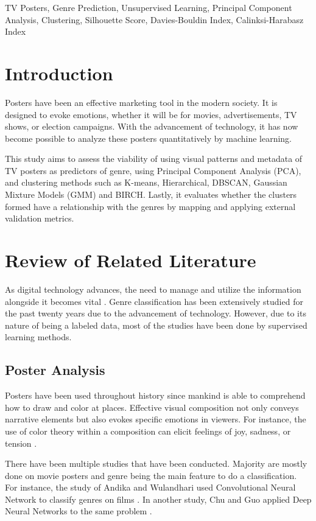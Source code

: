 \documentclass[conference]{IEEEtran}
\begin{document}
\begin{IEEEkeywords}
TV Posters, Genre Prediction, Unsupervised Learning, Principal Component Analysis, Clustering, Silhouette Score, Davies-Bouldin Index, Calinksi-Harabasz Index 
\end{IEEEkeywords}

\section{Introduction}
Posters have been an effective marketing tool in the modern society. It is designed to evoke emotions, whether it will be for movies, advertisements, TV shows, or election campaigns. With the advancement of technology, it has now become possible to analyze these posters quantitatively by machine learning. 

This study aims to assess the viability of using visual patterns and metadata of TV posters as predictors of genre, using Principal Component Analysis (PCA), and clustering methods such as K-means, Hierarchical, DBSCAN, Gaussian Mixture Models (GMM) and BIRCH. Lastly, it evaluates whether the clusters formed have a relationship with the genres by mapping and applying external validation metrics.

\section{Review of Related Literature}

As digital technology advances, the need to manage and utilize the information alongside it becomes vital \cite{b1}. Genre classification has been extensively studied for the past twenty years due to the advancement of technology. However, due to its nature of being a labeled data, most of the studies have been done by supervised learning methods. 

\subsection{Poster Analysis}

Posters have been used throughout history since mankind is able to comprehend how to draw and color at places. Effective visual composition not only conveys narrative elements but also evokes specific emotions in viewers. For instance, the use of color theory within a composition can elicit feelings of joy, sadness, or tension \cite{b2}. 

There have been multiple studies that have been conducted. Majority are mostly done on movie posters and genre being the main feature to do a classification. For instance, the study of Andika and Wulandhari used Convolutional Neural Network to classify genres on films \cite{b3}. In another study, Chu and Guo applied Deep Neural Networks to the same problem \cite{b4}. 
\end{document}
